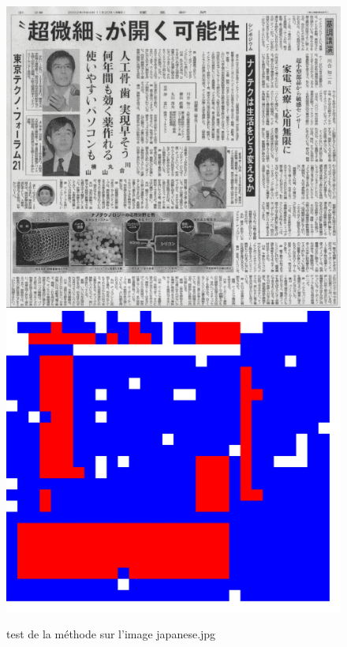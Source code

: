 \documentclass{book}
\begin{document}
\begin{figure}[H]
\begin{center}
\includegraphics[scale=0.05]{../test/japanese.jpg}
\includegraphics[scale=0.05]{../test/japanese_res_hog_hsv_kmeans.jpg}
\end{center}
\caption{test de la méthode sur l'image japanese.jpg}
\label{test3}
\end{figure}
\end{document}
